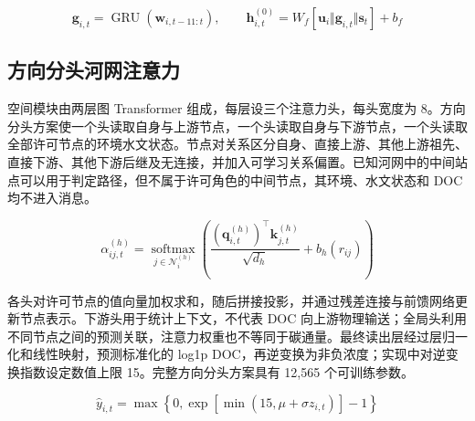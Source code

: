 \documentclass[UTF8,11pt,a4paper,fontset=none]{ctexart}
\begin{document}
\begin{equation}
\mathbf g_{i,t}=\operatorname{GRU}(\mathbf w_{i,t-11:t}),\qquad \mathbf h^{(0)}_{i,t}=W_f[\mathbf u_i\Vert\mathbf g_{i,t}\Vert\mathbf s_t]+b_f
\end{equation}

\subsection{方向分头河网注意力}

空间模块由两层图 Transformer 组成，每层设三个注意力头，每头宽度为 8。方向分头方案使一个头读取自身与上游节点，一个头读取自身与下游节点，一个头读取全部许可节点的环境水文状态。节点对关系区分自身、直接上游、其他上游祖先、直接下游、其他下游后继及无连接，并加入可学习关系偏置。已知河网中的中间站点可以用于判定路径，但不属于许可角色的中间节点，其环境、水文状态和 DOC 均不进入消息。


\begin{equation}
\alpha^{(h)}_{ij,t}=\underset{j\in\mathcal N_i^{(h)}}{\operatorname{softmax}}\!\left(\frac{(\mathbf q^{(h)}_{i,t})^\top\mathbf k^{(h)}_{j,t}}{\sqrt{d_h}}+b_h(r_{ij})\right)
\end{equation}

各头对许可节点的值向量加权求和，随后拼接投影，并通过残差连接与前馈网络更新节点表示。下游头用于统计上下文，不代表 DOC 向上游物理输送；全局头利用不同节点之间的预测关联，注意力权重也不等同于碳通量。最终读出层经过层归一化和线性映射，预测标准化的 log1p DOC，再逆变换为非负浓度；实现中对逆变换指数设定数值上限 15。完整方向分头方案具有 12,565 个可训练参数。


\begin{equation}
\widehat y_{i,t}=\max\!\left\{0,\exp\!\left[\min(15,\mu+\sigma z_{i,t})\right]-1\right\}
\end{equation}
\end{document}
